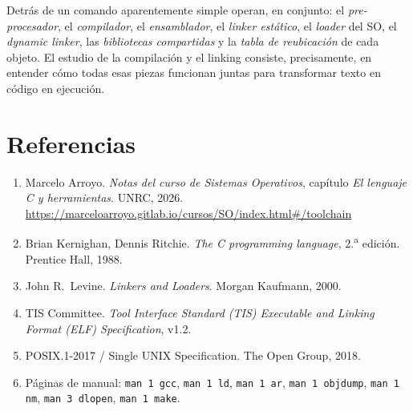\documentclass[11pt,a4paper]{article}
\begin{document}
Detrás de un comando aparentemente simple operan, en conjunto: el
\emph{pre-procesador}, el \emph{compilador}, el \emph{ensamblador},
el \emph{linker estático}, el \emph{loader} del SO, el
\emph{dynamic linker}, las \emph{bibliotecas compartidas} y la
\emph{tabla de reubicación} de cada objeto. El estudio de la
compilación y el linking consiste, precisamente, en entender cómo
todas esas piezas funcionan juntas para transformar texto en código
en ejecución.

\section*{Referencias}

\begin{enumerate}[leftmargin=*]
    \item Marcelo Arroyo. \emph{Notas del curso de Sistemas
        Operativos}, capítulo \emph{El lenguaje C y herramientas}.
        UNRC, 2026.\\
        \url{https://marceloarroyo.gitlab.io/cursos/SO/index.html\#/toolchain}
    \item Brian Kernighan, Dennis Ritchie. \emph{The C programming
        language}, 2.\textsuperscript{a} edición. Prentice Hall, 1988.
    \item John R.\ Levine. \emph{Linkers and Loaders}. Morgan
        Kaufmann, 2000.
    \item TIS Committee. \emph{Tool Interface Standard (TIS)
        Executable and Linking Format (ELF) Specification}, v1.2.
    \item POSIX.1-2017 / Single UNIX Specification. The Open Group,
        2018.
    \item Páginas de manual: \texttt{man 1 gcc}, \texttt{man 1 ld},
        \texttt{man 1 ar}, \texttt{man 1 objdump}, \texttt{man 1 nm},
        \texttt{man 3 dlopen}, \texttt{man 1 make}.
\end{enumerate}
\end{document}

